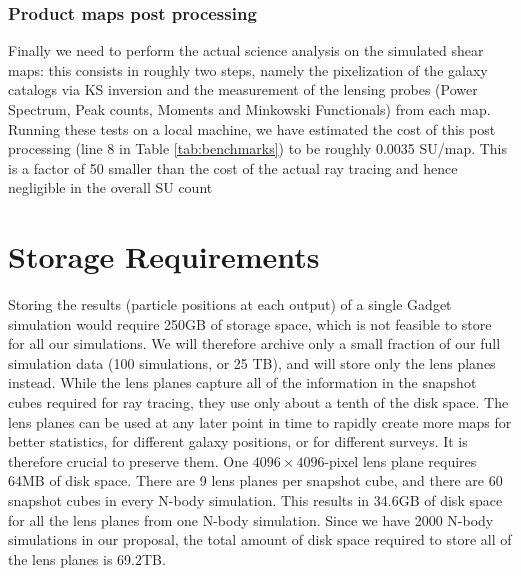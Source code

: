 \documentclass[10pt, preprint]{aastex}
\begin{document}
\subsubsection{Product maps post processing}

Finally we need to perform the actual science analysis on the simulated 
shear maps: this consists in roughly two steps, namely the pixelization
of the galaxy catalogs via KS inversion and the measurement of the lensing 
probes (Power Spectrum, Peak counts, Moments and Minkowski Functionals)
from each map. Running these tests on a local machine, we have estimated 
the cost of this post processing (line 8 in Table \ref{tab:benchmarks}) 
to be roughly 0.0035 SU/map. This is a factor of 50 smaller than the cost
of the actual ray tracing and hence negligible in the overall SU count

\section{Storage Requirements}

Storing the results (particle positions at each output) of a single
Gadget simulation would require 250GB of storage space, which is not
feasible to store for all our simulations. We will therefore archive
only a small fraction of our full simulation data (100 simulations, or
25 TB), and will store only the lens planes instead.  While the lens
planes capture all of the information in the snapshot cubes required
for ray tracing, they use only about a tenth of the disk space. The
lens planes can be used at any later point in time to rapidly create
more maps for better statistics, for different galaxy positions, or
for different surveys. It is therefore crucial to preserve them. One
$4096 \times 4096$-pixel lens plane requires 64MB of disk space. There
are 9 lens planes per snapshot cube, and there are 60 snapshot cubes
in every N-body simulation. This results in 34.6GB of disk space for
all the lens planes from one N-body simulation. Since we have 2000
N-body simulations in our proposal, the total amount of disk space
required to store all of the lens planes is 69.2TB.



\end{document}
